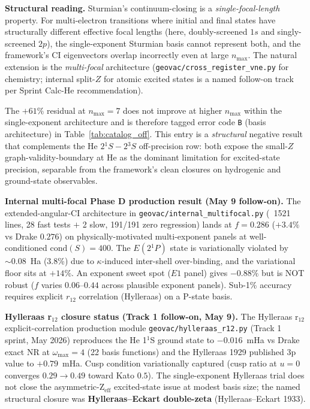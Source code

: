 \documentclass[11pt]{article}
\begin{document}
\textbf{Structural reading.}  Sturmian's continuum-closing is a
\emph{single-focal-length} property.  For multi-electron transitions where
initial and final states have structurally different effective focal lengths
(here, doubly-screened $1s$ and singly-screened $2p$), the single-exponent
Sturmian basis cannot represent both, and the framework's CI eigenvectors
overlap incorrectly even at large $n_{\max}$.  The natural extension is the
\emph{multi-focal} architecture (\verb|geovac/cross_register_vne.py| for
chemistry; internal split-$Z$ for atomic excited states is a named
follow-on track per Sprint Calc-He recommendation).

The $+61\%$ residual at $n_{\max} = 7$ does not improve at higher $n_{\max}$
within the single-exponent architecture and is therefore tagged error code
\texttt{B} (basis architecture) in
Table~\ref{tab:catalog_off}.  This entry is a \emph{structural} negative
result that complements the He $2{}^1\!S - 2{}^3\!S$ off-precision row:
both expose the small-$Z$ graph-validity-boundary at He as the dominant
limitation for excited-state precision, separable from the framework's
clean closures on hydrogenic and ground-state observables.

\textbf{Internal multi-focal Phase D production result (May 9 follow-on).}
The extended-angular-CI architecture in
\texttt{geovac/internal\_multifocal.py} (~1521 lines, 28 fast tests $+$ 2
slow, 191/191 zero regression) lands at $f = 0.286$ ($+3.4\%$ vs Drake
$0.276$) on physically-motivated multi-exponent panels at well-conditioned
$\mathrm{cond}(S) = 400$.  The $E(2{}^1\!P)$ state is variationally
violated by $\sim 0.08$~Ha (3.8\%) due to $\kappa$-induced inter-shell
over-binding, and the variational floor sits at $+14\%$.  An exponent
sweet spot ($E1$ panel) gives $-0.88\%$ but is NOT robust ($f$ varies
$0.06$--$0.44$ across plausible exponent panels).  Sub-1\% accuracy
requires explicit $r_{12}$ correlation (Hylleraas) on a P-state basis.

\textbf{Hylleraas r$_{12}$ closure status (Track 1 follow-on, May 9).}
The Hylleraas r$_{12}$ explicit-correlation production module
\texttt{geovac/hylleraas\_r12.py} (Track 1 sprint, May 2026) reproduces
the He 1$^1$S ground state to $-0.016$~mHa vs Drake exact NR at
$\omega_{\max} = 4$ (22 basis functions) and the Hylleraas 1929 published
3p value to $+0.79$~mHa.  Cusp condition variationally captured (cusp
ratio at $u=0$ converges $0.29 \to 0.49$ toward Kato $0.5$).  The
single-exponent Hylleraas trial does not close the asymmetric-Z$_{\text{eff}}$
excited-state issue at modest basis size; the named structural closure
was \textbf{Hylleraas--Eckart double-zeta} (Hylleraas--Eckart 1933).
\end{document}

